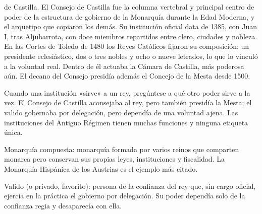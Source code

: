 \documentclass{book}
\begin{document}
\begin{tcolorbox}[title={Consejo}, studiumtip, breakable]

de Castilla. El Consejo de Castilla fue la columna vertebral y principal centro de poder de la estructura de gobierno de la Monarquía durante la Edad Moderna, y el arquetipo que copiaron los demás. Su institución oficial data de 1385, con Juan I, tras Aljubarrota, con doce miembros repartidos entre clero, ciudades y nobleza. En las Cortes de Toledo de 1480 los Reyes Católicos fijaron su composición: un presidente eclesiástico, dos o tres nobles y ocho o nueve letrados, lo que lo vinculó a la voluntad real. Dentro de él actuaba la Cámara de Castilla, más poderosa aún. El decano del Consejo presidía además el Concejo de la Mesta desde 1500.


Cuando una institución «sirve» a un rey, pregúntese a qué otro poder sirve a la vez. El Consejo de Castilla aconsejaba al rey, pero también presidía la Mesta; el valido gobernaba por delegación, pero dependía de una voluntad ajena. Las instituciones del Antiguo Régimen tienen muchas funciones y ninguna etiqueta única.

\end{tcolorbox}

\begin{tcolorbox}[title={Definición}, studiumdef, breakable]

Monarquía compuesta: monarquía formada por varios reinos que comparten monarca pero conservan sus propias leyes, instituciones y fiscalidad. La Monarquía Hispánica de los Austrias es el ejemplo más citado.

\end{tcolorbox}

\begin{tcolorbox}[title={Definición}, studiumdef, breakable]

Valido (o privado, favorito): persona de la confianza del rey que, sin cargo oficial, ejercía en la práctica el gobierno por delegación. Su poder dependía solo de la confianza regia y desaparecía con ella.

\end{tcolorbox}
\end{document}
